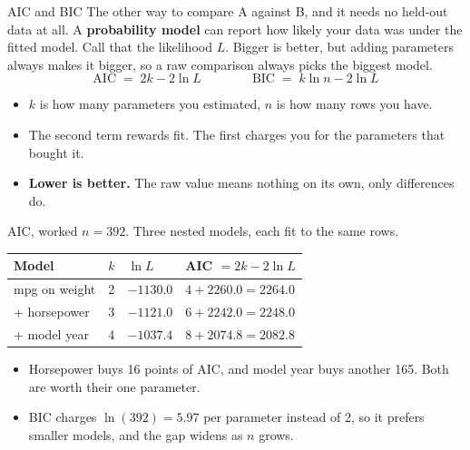 \documentclass[aspectratio=169]{beamer}
\begin{document}
\begin{frame}{AIC and BIC}
The other way to compare A against B, and it needs no held-out data at all. A \textbf{probability
model} can report how likely your data was under the fitted model. Call that the likelihood $L$. Bigger is better, but adding parameters always makes it bigger, so a
raw comparison always picks the biggest model.
\[
\text{AIC} \;=\; 2k - 2\ln L
\qquad\qquad
\text{BIC} \;=\; k\ln n - 2\ln L
\]
\begin{itemize}\small
  \item $k$ is how many parameters you estimated, $n$ is how many rows you have.
  \item The second term rewards fit. The first charges you for the parameters that bought it.
  \item \textbf{Lower is better.} The raw value means nothing on its own, only differences do.
\end{itemize}
\end{frame}

\begin{frame}{AIC, worked}
$n = 392$. Three nested models, each fit to the same rows.
\begin{center}\small
\begin{tabular}{L{0.30\textwidth} L{0.08\textwidth} L{0.14\textwidth} L{0.30\textwidth}}
\toprule
\textbf{Model} & \textbf{$k$} & \textbf{$\ln L$} & \textbf{AIC $= 2k - 2\ln L$} \\
\midrule
mpg on weight & 2 & $-1130.0$ & $4 + 2260.0 = 2264.0$ \\
\quad + horsepower & 3 & $-1121.0$ & $6 + 2242.0 = 2248.0$ \\
\quad + model year & 4 & $-1037.4$ & $8 + 2074.8 = 2082.8$ \\
\bottomrule
\end{tabular}
\end{center}
\begin{itemize}\small
  \item Horsepower buys 16 points of AIC, and model year buys another 165. Both are worth their
        one parameter.
  \item BIC charges $\ln(392) = 5.97$ per parameter instead of 2, so it prefers smaller models,
        and the gap widens as $n$ grows.
\end{itemize}
\end{frame}
\end{document}

